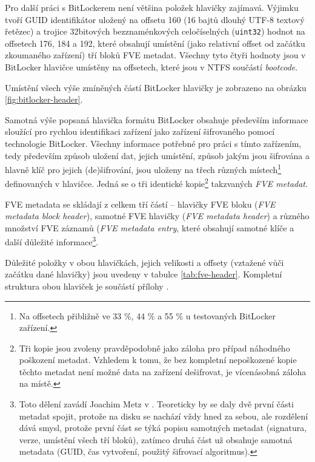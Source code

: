 Pro další práci s BitLockerem není většina položek hlavičky zajímavá. Výjimku tvoří GUID identifikátor uložený na offsetu 160 (16 bajtů dlouhý UTF-8 textový řetězec) a trojice 32bitových bezznaménkových celočíselných (\texttt{uint32}) hodnot na offsetech 176, 184 a 192, které obsahují umístění (jako relativní offset od začátku zkoumaného zařízení) tří bloků FVE metadat. Všechny tyto čtyři hodnoty jsou v BitLocker hlavičce umístěny na offsetech, které jsou v NTFS součástí \emph{bootcode}.

Umístění všech výše zmíněných  částí BitLocker hlavičky je zobrazeno na obrázku \ref{fig:bitlocker-header}.


\label{sec:fve-metadata}

Samotná výše popsaná hlavička formátu BitLocker obsahuje především informace sloužící pro rychlou identifikaci zařízení jako zařízení šifrovaného pomocí technologie BitLocker. Všechny informace potřebné pro práci s tímto zařízením, tedy především způsob uložení dat, jejich umístění, způsob jakým jsou šifrována a hlavně klíč pro jejich (de)šifrování, jsou uloženy na třech různých místech\footnote{Na offsetech přibližně ve 33 \%, 44 \% a 55 \% u testovaných BitLocker zařízení.} definovaných v hlavičce. Jedná se o tři identické kopie\footnote{Tři kopie jsou zvoleny pravděpodobně jako záloha pro případ náhodného poškození metadat. Vzhledem k tomu, že bez kompletní nepoškozené kopie těchto metadat není možné data na zařízení dešifrovat, je vícenásobná záloha na místě.} takzvaných \emph{FVE metadat}.

FVE metadata se skládají z celkem tří částí -- hlavičky FVE bloku (\emph{FVE metadata block header}), samotné FVE hlavičky (\emph{FVE metadata header}) a různého množství FVE záznamů (\emph{FVE metadata entry}, které obsahují samotné klíče a další důležité informace\cite{Metz2011}\footnote{Toto dělení zavádí Joachim Metz v \cite{Metz2011}. Teoreticky by se daly dvě první části metadat spojit, protože na disku se nachází vždy hned za sebou, ale rozdělení dává smysl, protože první část se týká popisu samotných metadat (signatura, verze, umístění všech tří bloků), zatímco druhá část už obsahuje samotná metadata (GUID, čas vytvoření, použitý šifrovací algoritmus).}.

Důležité položky v obou hlavičkách, jejich velikosti a offsety (vztažené vůči začátku dané hlavičky) jsou uvedeny v tabulce \ref{tab:fve-header}. Kompletní struktura obou hlaviček je součástí přílohy .

